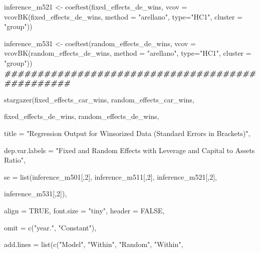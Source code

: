 \documentclass[a4paper,nobind]{templates/ociamthesis}
\newenvironment{Shaded}{\begin{snugshade}}{\end{snugshade}}
\newcommand{\AttributeTok}[1]{\textcolor[rgb]{0.77,0.63,0.00}{#1}}
\newcommand{\ConstantTok}[1]{\textcolor[rgb]{0.00,0.00,0.00}{#1}}
\newcommand{\DecValTok}[1]{\textcolor[rgb]{0.00,0.00,0.81}{#1}}
\newcommand{\DocumentationTok}[1]{\textcolor[rgb]{0.56,0.35,0.01}{\textbf{\textit{#1}}}}
\newcommand{\FunctionTok}[1]{\textcolor[rgb]{0.00,0.00,0.00}{#1}}
\newcommand{\NormalTok}[1]{#1}
\newcommand{\OtherTok}[1]{\textcolor[rgb]{0.56,0.35,0.01}{#1}}
\newcommand{\StringTok}[1]{\textcolor[rgb]{0.31,0.60,0.02}{#1}}
\renewenvironment{Shaded}
{
  \vspace{10pt}%
  \begin{snugshade}%
}{%
  \end{snugshade}%
  \vspace{8pt}%
}
\begin{document}
\begin{landscape}
\begin{Shaded}
\begin{Highlighting}[]
\NormalTok{inference\_m521 }\OtherTok{\textless{}{-}} \FunctionTok{coeftest}\NormalTok{(fixed\_effects\_de\_wins, }\AttributeTok{vcov =} \FunctionTok{vcovBK}\NormalTok{(fixed\_effects\_de\_wins, }\AttributeTok{method =} \StringTok{"arellano"}\NormalTok{, }\AttributeTok{type=}\StringTok{"HC1"}\NormalTok{, }\AttributeTok{cluster =} \StringTok{"group"}\NormalTok{))}

\NormalTok{inference\_m531 }\OtherTok{\textless{}{-}} \FunctionTok{coeftest}\NormalTok{(random\_effects\_de\_wins, }\AttributeTok{vcov =} \FunctionTok{vcovBK}\NormalTok{(random\_effects\_de\_wins, }\AttributeTok{method =} \StringTok{"arellano"}\NormalTok{, }\AttributeTok{type=}\StringTok{"HC1"}\NormalTok{, }\AttributeTok{cluster =} \StringTok{"group"}\NormalTok{))}
\DocumentationTok{\#\#\#\#\#\#\#\#\#\#\#\#\#\#\#\#\#\#\#\#\#\#\#\#\#\#\#\#\#\#\#\#\#\#\#\#\#\#\#\#\#\#\#\#\#\#\#\#}

\FunctionTok{stargazer}\NormalTok{(fixed\_effects\_car\_wins, random\_effects\_car\_wins, }
          
\NormalTok{          fixed\_effects\_de\_wins, random\_effects\_de\_wins,}
          
          \AttributeTok{title =} \StringTok{"Regression Output for Winsorized Data (Standard Errors in Brackets)"}\NormalTok{, }
          
          \AttributeTok{dep.var.labels =} \StringTok{"Fixed and Random Effects with Leverage and Capital to Assets Ratio"}\NormalTok{,}
          
          \AttributeTok{se =} \FunctionTok{list}\NormalTok{(inference\_m501[,}\DecValTok{2}\NormalTok{], inference\_m511[,}\DecValTok{2}\NormalTok{], inference\_m521[,}\DecValTok{2}\NormalTok{], }
          
\NormalTok{          inference\_m531[,}\DecValTok{2}\NormalTok{]),}
          
          \AttributeTok{align =} \ConstantTok{TRUE}\NormalTok{, }\AttributeTok{font.size =} \StringTok{"tiny"}\NormalTok{, }\AttributeTok{header =} \ConstantTok{FALSE}\NormalTok{, }
          
          \AttributeTok{omit =} \FunctionTok{c}\NormalTok{(}\StringTok{"year."}\NormalTok{, }\StringTok{"Constant"}\NormalTok{),}
          
          \AttributeTok{add.lines =} \FunctionTok{list}\NormalTok{(}\FunctionTok{c}\NormalTok{(}\StringTok{"Model"}\NormalTok{, }\StringTok{"Within"}\NormalTok{, }\StringTok{"Random"}\NormalTok{, }\StringTok{"Within"}\NormalTok{, }
                        

\end{Highlighting}
\end{Shaded}
\end{landscape}
\end{document}
